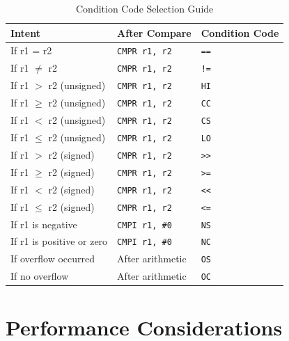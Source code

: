\begin{table}[H]
	\centering
	\small
	\begin{tabular}{lll}
		\toprule
		\textbf{Intent}            & \textbf{After Compare} & \textbf{Condition Code} \\
		\midrule
		If r1 = r2                 & \texttt{CMPR r1, r2}   & \texttt{==}             \\
		If r1 $\neq$ r2            & \texttt{CMPR r1, r2}   & \texttt{!=}             \\
		If r1 $>$ r2 (unsigned)    & \texttt{CMPR r1, r2}   & \texttt{HI}             \\
		If r1 $\geq$ r2 (unsigned) & \texttt{CMPR r1, r2}   & \texttt{CC}             \\
		If r1 $<$ r2 (unsigned)    & \texttt{CMPR r1, r2}   & \texttt{CS}             \\
		If r1 $\leq$ r2 (unsigned) & \texttt{CMPR r1, r2}   & \texttt{LO}             \\
		If r1 $>$ r2 (signed)      & \texttt{CMPR r1, r2}   & \texttt{>>}             \\
		If r1 $\geq$ r2 (signed)   & \texttt{CMPR r1, r2}   & \texttt{>=}             \\
		If r1 $<$ r2 (signed)      & \texttt{CMPR r1, r2}   & \texttt{<<}             \\
		If r1 $\leq$ r2 (signed)   & \texttt{CMPR r1, r2}   & \texttt{<=}             \\
		If r1 is negative          & \texttt{CMPI r1, \#0}  & \texttt{NS}             \\
		If r1 is positive or zero  & \texttt{CMPI r1, \#0}  & \texttt{NC}             \\
		If overflow occurred       & After arithmetic       & \texttt{OS}             \\
		If no overflow             & After arithmetic       & \texttt{OC}             \\
		\bottomrule
	\end{tabular}
	\caption{Condition Code Selection Guide}
	\label{tab:condition-selection}
\end{table}

\section{Performance Considerations}

